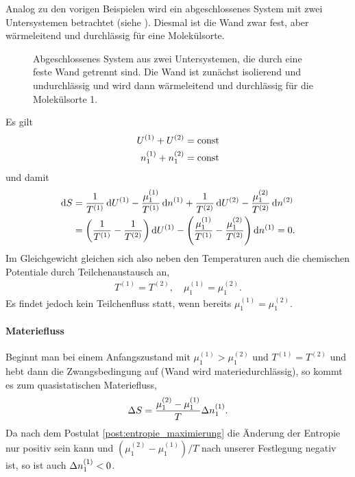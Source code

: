 Analog zu den vorigen Beispielen wird ein abgeschlossenes System mit zwei Untersystemen betrachtet (siehe ). Diesmal ist die Wand zwar fest, aber wärmeleitend und durchlässig für eine Molekülsorte.

\begin{figure}[htbp]
    \centering
    \tfigDoppelsystemUVNbeweglicheIsolierendeWand
    \caption{Abgeschlossenes System aus zwei Untersystemen, die durch eine feste Wand getrennt sind. Die Wand ist zunächst isolierend und undurchlässig und wird dann wärmeleitend und durchlässig für die Molekülsorte 1.}
    \label{fig:DoppelsystemUVNbeweglicheIsolierendeWand}
\end{figure}

Es gilt
\begin{align*}
    U^{(1)} + U^{(2)}         & = \mathrm{const} \\
    n_1^{(1)} + n_1^{(2)} & = \mathrm{const}
\end{align*}
und damit
\begin{align*}
    \mathop{}\!\mathrm{d} S & = \frac{1}{T^{(1)}}\mathop{}\!\mathrm{d} U^{(1)} - \frac{\mu_1^{(1)}}{T^{(1)}}\mathop{}\!\mathrm{d} n^{(1)}+\frac{1}{T^{(2)}}\mathop{}\!\mathrm{d} U^{(2)} - \frac{\mu_1^{(2)}}{T^{(2)}}\mathop{}\!\mathrm{d} n^{(2)}   \\
            & = \left(\frac{1}{T^{(1)}}-\frac{1}{T^{(2)}}\right)\mathop{}\!\mathrm{d} U^{(1)} - \left(\frac{\mu_1^{(1)}}{T^{(1)}}-\frac{\mu_1^{(2)}}{T^{(2)}}\right) \mathop{}\!\mathrm{d} n^{(1)} = 0.
\end{align*}
Im Gleichgewicht gleichen sich also neben den Temperaturen auch die chemischen Potentiale durch Teilchenaustausch an,
\begin{align*}
    T^{(1)} = T^{(2)}, \quad \mu_1^{(1)} = \mu_1^{(2)}.
\end{align*}
Es findet jedoch kein Teilchenfluss statt, wenn bereits $\mu_1^{(1)} = \mu_1^{(2)}$.

\paragraph*{Materiefluss}

Beginnt man bei einem Anfangszustand mit $\mu_1^{(1)} > \mu_1^{(2)}$ und $T^{(1)} = T^{(2)}$ und hebt dann die Zwangsbedingung auf (Wand wird materiedurchlässig), so kommt es zum quasistatischen Materiefluss,
\begin{align*}
    \Delta S = \frac{\mu_1^{(2)} - \mu_1^{(1)}}{T} \Delta n_1^{(1)}.
\end{align*}
Da nach dem Postulat \ref{post:entropie_maximierung} die Änderung der Entropie nur positiv sein kann und $(\mu_1^{(2)} - \mu_1^{(1)})/T$ nach unserer Festlegung negativ ist, so ist auch $\Delta n_1^{(1)}<0$.

